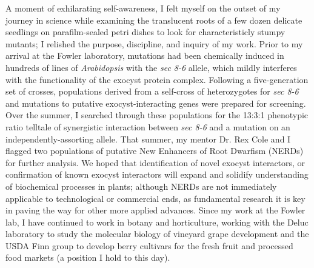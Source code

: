 \documentclass[12pt]{book}
\begin{document}
A moment of exhilarating self-awareness, I felt myself on the outset of my journey in science while examining the translucent roots of a few dozen delicate seedlings on parafilm-sealed petri dishes to look for characteristicly stumpy mutants; I relished the purpose, discipline, and inquiry of my work. Prior to my arrival at the Fowler laboratory, mutations had been chemically induced in hundreds of lines of \textit{Arabidopsis} with the \textit{sec 8-6} allele, which mildly interferes with the functionality of the exocyst protein complex. Following a five-generation set of crosses, populations derived from a self-cross of heterozygotes for \textit{sec 8-6} and mutations to putative exocyst-interacting genes were prepared for screening. Over the summer, I searched through these populations for the 13:3:1 phenotypic ratio telltale of synergistic interaction between \textit{sec 8-6} and a mutation on an independently-assorting allele. That summer, my mentor Dr. Rex Cole and I flagged two populations of putative New Enhancers of Root Dwarfism (NERDs) for further analysis. We hoped that identification of novel exocyst interactors, or confirmation of known exocyst interactors will expand and solidify understanding of biochemical processes in plants; although NERDs are not immediately applicable to technological or commercial ends, as fundamental research it is key in paving the way for other more applied advances. Since my work at the Fowler lab, I have continued to work in botany and horticulture, working with the Deluc laboratory to study the molecular biology of vineyard grape development and the USDA Finn group to develop berry cultivars for the fresh fruit and processed food markets (a position I hold to this day). 


\end{document}

